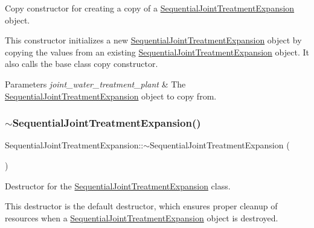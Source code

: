 Copy constructor for creating a copy of a \mbox{\hyperlink{classSequentialJointTreatmentExpansion}{Sequential\+Joint\+Treatment\+Expansion}} object. 

This constructor initializes a new {\ttfamily \mbox{\hyperlink{classSequentialJointTreatmentExpansion}{Sequential\+Joint\+Treatment\+Expansion}}} object by copying the values from an existing {\ttfamily \mbox{\hyperlink{classSequentialJointTreatmentExpansion}{Sequential\+Joint\+Treatment\+Expansion}}} object. It also calls the base class copy constructor.


\begin{DoxyParams}{Parameters}
{\em joint\+\_\+water\+\_\+treatment\+\_\+plant} & The {\ttfamily \mbox{\hyperlink{classSequentialJointTreatmentExpansion}{Sequential\+Joint\+Treatment\+Expansion}}} object to copy from. \\
\hline
\end{DoxyParams}
\mbox{\label{classSequentialJointTreatmentExpansion_a77d4270fd89d172739fdede5b9e6c1e9}} 
\subsubsection{\texorpdfstring{$\sim$\+Sequential\+Joint\+Treatment\+Expansion()}{~SequentialJointTreatmentExpansion()}}
{\footnotesize\ttfamily Sequential\+Joint\+Treatment\+Expansion\+::$\sim$\+Sequential\+Joint\+Treatment\+Expansion (\begin{DoxyParamCaption}{ }\end{DoxyParamCaption})\hspace{0.3cm}{\ttfamily [override]}}



Destructor for the \mbox{\hyperlink{classSequentialJointTreatmentExpansion}{Sequential\+Joint\+Treatment\+Expansion}} class. 

This destructor is the default destructor, which ensures proper cleanup of resources when a {\ttfamily \mbox{\hyperlink{classSequentialJointTreatmentExpansion}{Sequential\+Joint\+Treatment\+Expansion}}} object is destroyed. 


